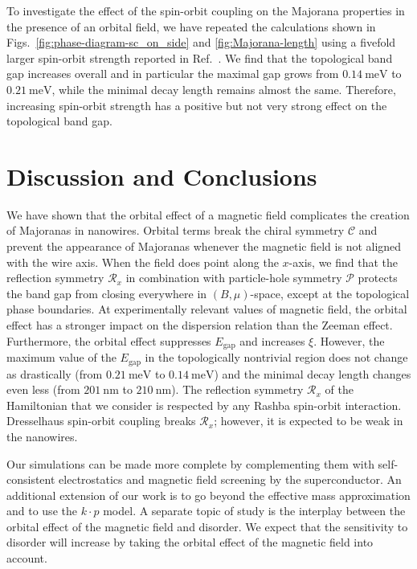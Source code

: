 To investigate the effect of the spin-orbit coupling on the Majorana properties in the presence of an orbital field, we have repeated the calculations shown in Figs.~\ref{fig:phase-diagram-sc_on_side} and \ref{fig:Majorana-length} using a fivefold larger spin-orbit strength reported in Ref.~\cite{Weperen2015}.
We find that the topological band gap increases overall and in particular the maximal gap grows from $\SI{0.14}{\milli\electronvolt}$ to $\SI{0.21}{\milli\electronvolt}$, while the minimal decay length remains almost the same.
Therefore, increasing spin-orbit strength has a positive but not very strong effect on the topological band gap.

\section{Discussion and Conclusions}

We have shown that the orbital effect of a magnetic field complicates the creation of Majoranas in nanowires.
Orbital terms break the chiral symmetry $\mathcal{C}$ and prevent the appearance of Majoranas whenever the magnetic field is not aligned with the wire axis.
When the field does point along the $x$-axis, we find that the reflection symmetry $\mathcal{R}_x$ in combination with particle-hole symmetry $\mathcal{P}$ protects the band gap from closing everywhere in $(B,\mu)$-space, except at the topological phase boundaries.
At experimentally relevant values of magnetic field, the orbital effect has a stronger impact on the dispersion relation than the Zeeman effect.
Furthermore, the orbital effect suppresses $E_\textrm{gap}$ and increases $\xi$.
However, the maximum value of the $E_\textrm{gap}$ in the topologically nontrivial region does not change as drastically (from $\SI{0.21}{\milli\electronvolt}$ to $\SI{0.14}{\milli\electronvolt}$) and the minimal decay length changes even less (from $\SI{201}{\nano\metre}$ to $\SI{210}{\nano\metre}$).
The reflection symmetry $\mathcal{R}_x$ of the Hamiltonian that we consider is respected by any Rashba spin-orbit interaction.
Dresselhaus spin-orbit coupling breaks $\mathcal{R}_x$; however, it is expected to be weak in the nanowires.

Our simulations can be made more complete by complementing them with self-consistent electrostatics and magnetic field screening by the superconductor.
An additional extension of our work is to go beyond the effective mass approximation and to use the $k \cdot p$ model.
A separate topic of study is the interplay between the orbital effect of the magnetic field and disorder.
We expect that the sensitivity to disorder will increase by taking the orbital effect of the magnetic field into account.

